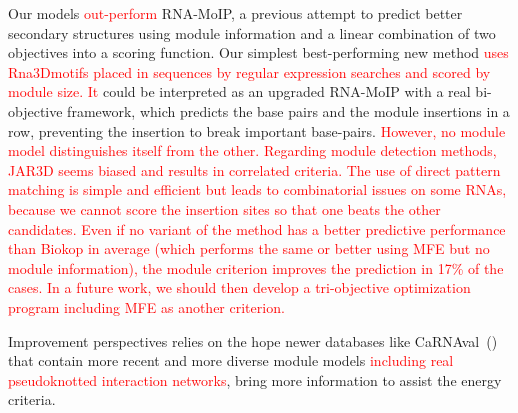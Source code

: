 \documentclass{bioinfo}
\begin{document}
Our models \textcolor{red}{out-perform} RNA-MoIP, a previous attempt to predict better secondary structures using module information and a linear combination of two objectives into a scoring function. Our simplest best-performing new method \textcolor{red}{uses Rna3Dmotifs placed in sequences by regular expression searches and scored by module size. It} could be interpreted as an upgraded RNA-MoIP with a real bi-objective framework, which predicts the base pairs and the module insertions in a row, preventing the insertion to break important base-pairs. \textcolor{red}{However, no module model distinguishes itself from the other. Regarding module detection methods, JAR3D seems biased and results in correlated criteria. The use of direct pattern matching is simple and efficient but leads to combinatorial issues on some RNAs, because we cannot score the insertion sites so that one beats the other candidates. Even if no variant of the method has a better predictive performance than Biokop in average (which performs the same or better using MFE but no module information), the module criterion improves the prediction in  17\% of the cases.} \textcolor{red}{In a future work, we should then develop a tri-objective optimization program including MFE as another criterion.}

Improvement perspectives relies on the hope newer databases like CaRNAval~(\citealp{reinharz2018mining}) that contain more recent and more diverse module models \textcolor{red}{including real pseudoknotted interaction networks},
bring more information to assist the energy criteria. 
\end{document}
